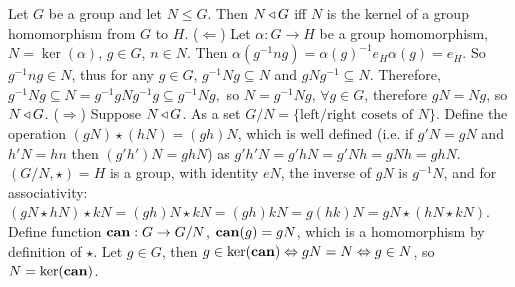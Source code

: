  Let $G$ be a group and let $N \le G$. Then $N \operatorname{\triangleleft} G$ iff $N$ is the kernel of a group homomorphism from $G$ to $H$.
\wpf ($\Leftarrow$) Let $\alpha: G \to H$ be a group homomorphism, $N = \ker{(\alpha)}$, $g \in G$, $n \in N$. Then 
$\alpha(g^{-1} n g) = \alpha(g)^{-1} e_H \alpha(g) = e_H$. So $g^{-1}ng \in N$, thus for any $g \in G$, $g^{-1}Ng \subseteq N$ and $gNg^{-1} \subseteq N$. Therefore, 
$g^{-1}Ng \subseteq N = g^{-1}gNg^{-1}g \subseteq g^{-1}Ng,$
so $N = g^{-1}Ng$, $\forall g \in G$, therefore $gN = Ng$, so $N \operatorname{\triangleleft} G$.\newline
($\Rightarrow$) Suppose $N \operatorname{\triangleleft} G$. As a set $G/N = \{\text{left/right cosets of }N\}$. Define the operation $(gN) \star (hN) = (gh)N$, which is well defined (i.e. if $g'N=gN$ and $h'N = hn$ then $(g'h')N = ghN$) as $g'h'N = g'hN =g'Nh = gNh = ghN$. $(G/N, \star) =H$ is a group, with identity $eN$, the inverse of $gN$ is $g^{-1}N$, and for associativity: $(gN \star hN) \star kN = (gh)N \star kN = (gh)kN = g(hk)N = gN \star (hN \star kN)$. Define function $\text{\textbf{can}}: G \to G/N$, $\text{\textbf{can}}(g)=gN$, which is a homomorphism by definition of $\star$. Let $g \in G$, then $g \in \ker(\text{\textbf{can}}) \Leftrightarrow gN = N \Leftrightarrow g \in N$, so $N = \ker(\text{\textbf{can}})$.